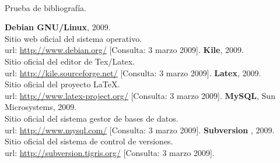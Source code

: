 \paragraph{}Prueba de bibliografía.

\begin{thebibliography}{xxxxxxxxxx}

 \textbf{Debian GNU/Linux}, 2009.\\
         Sitio web oficial del sistema operativo.\\
         url: \url{http://www.debian.org/}
         [Consulta: 3 marzo 2009].
 \textbf{Kile}, 2009.\\
         Sitio oficial del editor de Tex/Latex.\\
         url: \url{http://kile.sourceforge.net/}
         [Consulta: 3 marzo 2009].
 \textbf{Latex}, 2009.\\
         Sitio oficial del proyecto \LaTeX.\\
         url: \url{http://www.latex-project.org/}
         [Consulta: 3 marzo 2009].
 \textbf{MySQL}, Sun Microsystems, 2009.\\
         Sitio oficial del sistema gestor de bases de datos.\\
         url: \url{http://www.mysql.com/}
         [Consulta: 3 marzo 2009].
 \textbf{Subversion} , 2009.\\
         Sitio oficial del sistema de control de versiones.\\
         url: \url{http://subversion.tigris.org/}
         [Consulta: 3 marzo 2009].
 \end{thebibliography}